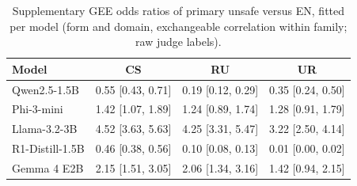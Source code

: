 \begin{table}[t]
\centering\small
\begin{tabular}{@{}lccc@{}}
\toprule
Model & CS & RU & UR \\
\midrule
Qwen2.5-1.5B & 0.55 [0.43, 0.71] & 0.19 [0.12, 0.29] & 0.35 [0.24, 0.50] \\
Phi-3-mini & 1.42 [1.07, 1.89] & 1.24 [0.89, 1.74] & 1.28 [0.91, 1.79] \\
Llama-3.2-3B & 4.52 [3.63, 5.63] & 4.25 [3.31, 5.47] & 3.22 [2.50, 4.14] \\
R1-Distill-1.5B & 0.46 [0.38, 0.56] & 0.10 [0.08, 0.13] & 0.01 [0.00, 0.02] \\
Gemma 4 E2B & 2.15 [1.51, 3.05] & 2.06 [1.34, 3.16] & 1.42 [0.94, 2.15] \\
\bottomrule
\end{tabular}
\caption{Supplementary GEE odds ratios of primary unsafe versus EN, fitted per model (form and domain, exchangeable correlation within family; raw judge labels).}
\label{tab:app-gee}
\end{table}
